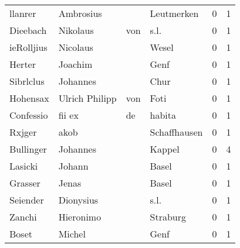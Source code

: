 \begin{tabular}{llllrr}
                  llanrer &                          Ambrosius &             &                                  Leutmerken &          0 &         1 \\
                 Dieebach &                           Nikolaus &         von &                                        s.l. &          0 &         1 \\
               ieRolljius &                           Nicolaus &             &                                       Wesel &          0 &         1 \\
                   Herter &                            Joachim &             &                                        Genf &          0 &         1 \\
                Sibrlclus &                           Johannes &             &                                        Chur &          0 &         1 \\
                 Hohensax &                     Ulrich Philipp &         von &                                        Foti &          0 &         1 \\
                Confessio &                             fii ex &          de &                                      habita &          0 &         1 \\
                   Rxjger &                               akob &             &                                Schaffhausen &          0 &         1 \\
                Bullinger &                           Johannes &             &                                      Kappel &          0 &         4 \\
                  Lasicki &                             Johann &             &                                       Basel &          0 &         1 \\
                  Grasser &                              Jenas &             &                                       Basel &          0 &         1 \\
                 Seiender &                          Dionysius &             &                                        s.l. &          0 &         1 \\
                   Zanchi &                          Hieronimo &             &                                    Straburg &          0 &         1 \\
                    Boset &                             Michel &             &                                        Genf &          0 &         1 \\

\end{tabular}
